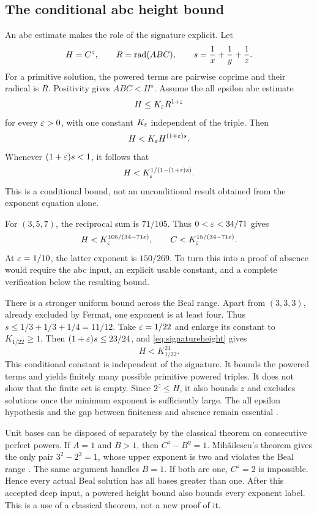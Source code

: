 \subsection{The conditional abc height bound}
An abc estimate makes the role of the signature explicit. Let
\[
H=C^z,\qquad R=\operatorname{rad}(ABC),\qquad s=\frac1x+\frac1y+\frac1z.
\]
For a primitive solution, the powered terms are pairwise coprime and their radical is $R$. Positivity gives $ABC<H^s$. Assume the all epsilon abc estimate
\begin{equation}\label{eq:abc-assumed}
H\le K_\varepsilon R^{1+\varepsilon}
\end{equation}
for every $\varepsilon>0$, with one constant $K_\varepsilon$ independent of the triple. Then
\[
H<K_\varepsilon H^{(1+\varepsilon)s}.
\]
Whenever $(1+\varepsilon)s<1$, it follows that
\begin{equation}\label{eq:signatureheight}
H<K_\varepsilon^{1/(1-(1+\varepsilon)s)}.
\end{equation}
This is a conditional bound, not an unconditional result obtained from the exponent equation alone.

For $(3,5,7)$, the reciprocal sum is $71/105$. Thus $0<\varepsilon<34/71$ gives
\begin{equation}\label{eq:357abc}
H<K_\varepsilon^{105/(34-71\varepsilon)},\qquad
C<K_\varepsilon^{15/(34-71\varepsilon)}.
\end{equation}
At $\varepsilon=1/10$, the latter exponent is $150/269$. To turn this into a proof of absence would require the abc input, an explicit usable constant, and a complete verification below the resulting bound.

There is a stronger uniform bound across the Beal range. Apart from $(3,3,3)$, already excluded by Fermat, one exponent is at least four. Thus $s\le1/3+1/3+1/4=11/12$. Take $\varepsilon=1/22$ and enlarge its constant to $K_{1/22}\ge1$. Then $(1+\varepsilon)s\le23/24$, and \eqref{eq:signatureheight} gives
\begin{equation}\label{eq:uniformbealabc}
H<K_{1/22}^{24}.
\end{equation}
This conditional constant is independent of the signature. It bounds the powered terms and yields finitely many possible primitive powered triples. It does not show that the finite set is empty. Since $2^z\le H$, it also bounds $z$ and excludes solutions once the minimum exponent is sufficiently large. The all epsilon hypothesis and the gap between finiteness and absence remain essential \cite{darmon-granville1995}.

Unit bases can be disposed of separately by the classical theorem on consecutive perfect powers. If $A=1$ and $B>1$, then $C^z-B^y=1$. Mih\u{a}ilescu's theorem gives the only pair $3^2-2^3=1$, whose upper exponent is two and violates the Beal range \cite{mihailescu2004,mihailescu2005,bilu2005}. The same argument handles $B=1$. If both are one, $C^z=2$ is impossible. Hence every actual Beal solution has all bases greater than one. After this accepted deep input, a powered height bound also bounds every exponent label. This is a use of a classical theorem, not a new proof of it.

